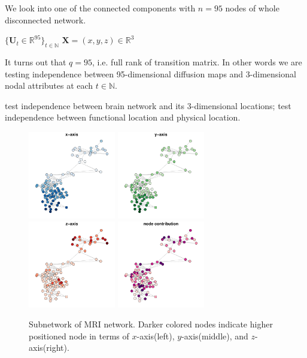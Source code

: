 \documentclass[12pt]{article}
\theoremstyle{definition}
\begin{document}
We look into one of the connected components with $n = 95$ nodes of whole disconnected network. 
	
$\{ \mathbf{U}_{t} \in \mathbb{R}^{95} \}_{t \in \mathbb{N}}$ $\mathbf{X} = (x,y,z) \in \mathbb{R}^{3}$
	
It turns out that $q=95$, i.e. full rank of transition matrix. In other words we are testing independence between 95-dimensional diffusion maps and 3-dimensional nodal attributes at each $t \in \mathbb{N}$.
	
	
test independence between brain network and its 3-dimensional locations; test independence between functional location and physical location. 
	
\begin{figure}[H]
	\centering
		\includegraphics[width=1.5in]{../Figure/brain1_x.pdf}
		\includegraphics[width=1.5in]{../Figure/brain1_y.pdf}
		\includegraphics[width=1.5in]{../Figure/brain1_z.pdf}
		\includegraphics[width=1.5in]{../Figure/brain1_weight.pdf}
	\caption{Subnetwork of MRI network. Darker colored nodes indicate higher positioned node in terms of $x$-axis(left), $y$-axis(middle), and $z$-axis(right).}
		\label{fig:mri}
\end{figure}
	
\end{document}
